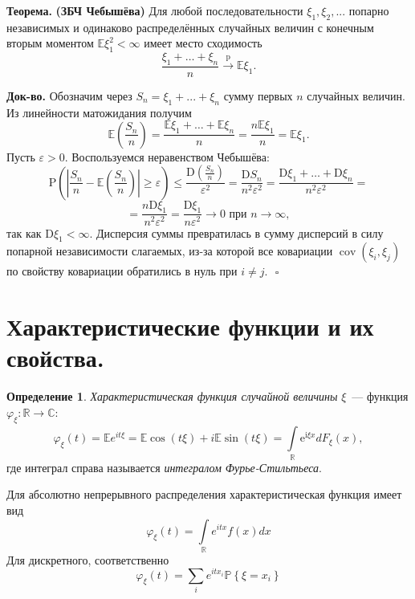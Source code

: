 \documentclass[oneside,final,14pt]{extreport}
\newcommand\myth{{\bf Теорема.}}
\newcommand\myqed{{\bf Док-во.}}
\theoremstyle{definition}
\newtheorem{defn}{Определение}[section]
\begin{document}
\myth{} \textbf{(ЗБЧ Чебышёва)} Для любой последовательности $\xi_1, \xi_2, ...$ попарно независимых и одинаково распределённых случайных величин с конечным вторым моментом $\mathbb{E}\xi_1^2 < \infty$ имеет место сходимость
$$\frac{\xi_{1}+\ldots+\xi_{n}}{n} \stackrel{\mathrm{p}}{\longrightarrow} \mathbb{E} \xi_{1}.$$

\myqed{} Обозначим через $S_n = \xi_1 + ... + \xi_n$ сумму первых $n$ случайных величин. Из линейности матожидания получим
$$\mathbb{E}\left(\frac{S_{n}}{n}\right)=\frac{\mathbb{E} \xi_{1}+\ldots+\mathbb{E} \xi_{n}}{n}=\frac{n \mathbb{E} \xi_{1}}{n}=\mathbb{E} \xi_{1}.$$
Пусть $\varepsilon > 0.$ Воспользуемся неравенством Чебышёва:
$$\mathrm{P}\left(\left|\frac{S_{n}}{n}-\mathbb{E}\left(\frac{S_{n}}{n}\right)\right| \geqslant \varepsilon\right) \leqslant \frac{\mathrm{D}\left(\frac{S_{n}}{n}\right)}{\varepsilon^{2}}=\frac{\mathrm{D} S_{n}}{n^{2} \varepsilon^{2}}=\frac{\mathrm{D} \xi_{1}+\ldots+\mathrm{D} \xi_{n}}{n^{2} \varepsilon^{2}}=$$$$=\frac{n \mathrm{D} \xi_{1}}{n^{2} \varepsilon^{2}}=\frac{\mathrm{D} \xi_{1}}{n \varepsilon^{2}} \rightarrow 0 \text { при } n \rightarrow \infty,$$
так как $\mathrm{D}\xi_1 < \infty$. Дисперсия суммы превратилась в сумму дисперсий в силу попарной независимости слагаемых, из-за которой все ковариации $\operatorname{cov}(\xi_i, \xi_j)$ по свойству ковариации обратились в нуль при $i \neq j. ~~~ \square$

\section{Характеристические функции и их свойства.}
\begin{defn}
    {\it Характеристическая функция случайной величины} $\xi$~--- функция $\varphi_{\xi}: \mathbb{R} \rightarrow \mathbb{C}$:
    \begin{equation*}
        \varphi_{\xi}(t)
        = \mathbb{E} e^{i t \xi}
        = \mathbb{E} \cos (t \xi)+i \mathbb{E} \sin (t \xi) = \int\limits_{\mathbb{R}}^{} \mathrm{e}^{\mathrm{i} \xi x} d F_{\xi}(x),
    \end{equation*}
    где интеграл справа называется {\it интегралом Фурье-Стильтьеса}.
    
    Для абсолютно непрерывного распределения характеристическая функция имеет вид
    \begin{equation*}
        \varphi_{\xi}(t)=\int\limits_{\mathbb{R}} e^{i t x} f(x) d x
    \end{equation*}
    Для дискретного, соответственно
    \begin{equation*}
        \varphi_{\xi}(t)=\sum_{i} e^{i t x_{i}} \mathbb{P}\left\{\xi=x_{i}\right\}
    \end{equation*}
\end{defn}
\end{document}
